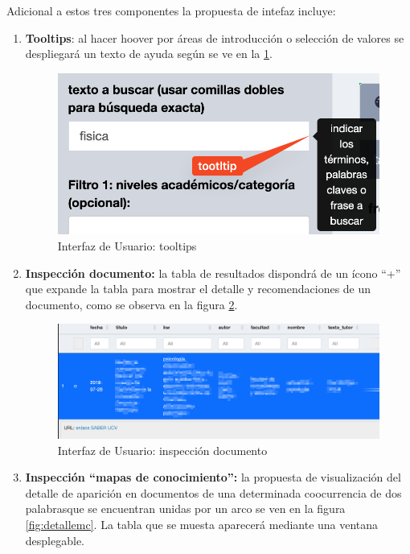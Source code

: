 \documentclass[
  12pt,
  openany]{book}
\begin{document}
Adicional a estos tres componentes la propuesta de intefaz incluye:

\begin{enumerate}
\def\labelenumi{\arabic{enumi}.}
\item
  \textbf{Tooltips}: al hacer hoover por áreas de introducción o selección de valores se despliegará un texto de ayuda según se ve en la \ref{fig:tooltip}.

  \begin{figure}

  {\centering \includegraphics[width=0.3\linewidth]{images/05-desarrollo/4_ciclo/UI/tooltip} 

  }

  \caption{Interfaz de Usuario: tooltips }\label{fig:tooltip}
  \end{figure}
\item
  \textbf{Inspección documento:} la tabla de resultados dispondrá de un ícono ``+'' que expande la tabla para mostrar el detalle y recomendaciones de un documento, como se observa en la figura \ref{fig:detalledoc}.

  \begin{figure}

  {\centering \includegraphics[width=0.9\linewidth]{images/05-desarrollo/4_ciclo/UI/uiinspecciontabla} 

  }

  \caption{Interfaz de Usuario: inspección documento }\label{fig:detalledoc}
  \end{figure}
\item
  \textbf{Inspección ``mapas de conocimiento'':} la propuesta de visualización del detalle de aparición en documentos de una determinada coocurrencia de dos palabrasque se encuentran unidas por un arco se ven en la figura \ref{fig:detallemc}. La tabla que se muesta aparecerá mediante una ventana desplegable.


\end{enumerate}
\end{document}

